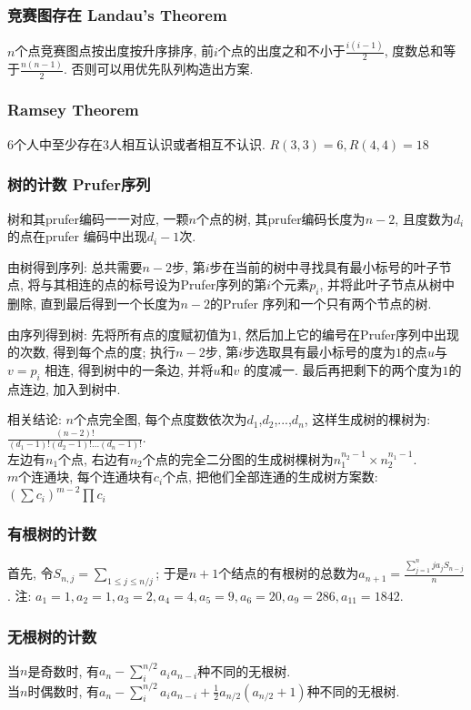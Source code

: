\subsubsection{竞赛图存在 Landau’s Theorem}
    $n$个点竞赛图点按出度按升序排序, 前$i$个点的出度之和不小于$\frac{i(i-1)}{2}$, 度数总和等于$\frac{n(n-1)}{2}$. 否则可以用优先队列构造出方案.

\subsubsection{Ramsey Theorem}
    $6$个人中至少存在$3$人相互认识或者相互不认识. $R(3,3)=6, R(4,4)=18$

\subsubsection{树的计数 Prufer序列}
    树和其prufer编码一一对应, 一颗$n$个点的树, 其prufer编码长度为${n-2}$, 且度数为$d_i$ 的点在prufer 编码中出现${d_i -1}$次. 
    \par 由树得到序列: 总共需要$n-2$步, 第$i$步在当前的树中寻找具有最小标号的叶子节点, 将与其相连的点的标号设为Prufer序列的第$i$个元素$p_i$, 并将此叶子节点从树中删除, 直到最后得到一个长度为$n-2$的Prufer 序列和一个只有两个节点的树. 
    \par 由序列得到树: 先将所有点的度赋初值为$1$, 然后加上它的编号在Prufer序列中出现的次数, 得到每个点的度; 执行$n-2$步, 第$i$步选取具有最小标号的度为$1$的点$u$与$v=p_i$ 相连, 得到树中的一条边, 并将$u$和$v$ 的度减一. 最后再把剩下的两个度为$1$的点连边, 加入到树中. 
    \par 相关结论: $n$个点完全图, 每个点度数依次为$d_1$,$d_2$,...,$d_n$, 这样生成树的棵树为: ${\frac{(n-2)!}{(d_1-1)!(d_2-1)!...(d_n-1)!}}$.\\
    左边有$n_1$个点, 右边有$n_2$个点的完全二分图的生成树棵树为$n_1^{n_2-1}\times n_2^{n_1-1}$. \\
    $m$个连通块, 每个连通块有$c_i$个点, 把他们全部连通的生成树方案数: $(\sum c_i)^{m-2}\prod c_i$
\subsubsection{有根树的计数}\noindent
    首先, 令$S_{n,j}=\sum_{1\leq j\leq n/j}$; 于是$n+1$个结点的有根树的总数为$ a_{n+1}=\frac{\sum_{j=1}^nja_jS_{n-j}}{n}$. 注: $a_1=1,a_2=1,a_3=2,a_4=4,a_5=9,a_6=20,a_9=286,a_11=1842$. 
\subsubsection{无根树的计数}\noindent
    当$n$是奇数时, 有$a_n-\sum_{i}^{n/2}a_ia_{n-i}$种不同的无根树. \\
    当$n$时偶数时, 有$a_n-\sum_{i}^{n/2}a_ia_{n-i}+\frac{1}{2}a_{n/2}(a_{n/2}+1)$种不同的无根树. 
